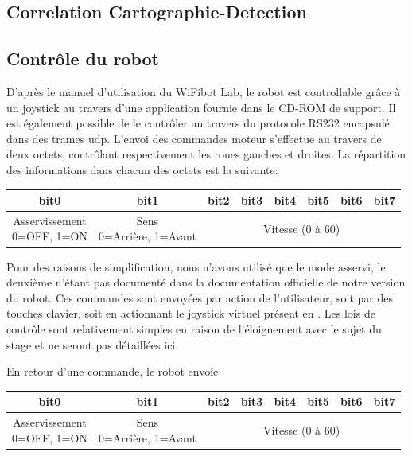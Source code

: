 		\subsection{Correlation Cartographie-Detection}
		\label{sub:corr}
		
			
		\subsection{Contrôle du robot}
		
			D'après le manuel d'utilisation du WiFibot Lab\cite{wifibot}, le robot est controllable grâce à un joystick au travers d'une application fournie dans le CD-ROM de support. Il est également possible de le contrôler au travers du protocole RS232\cite{rs232} encapsulé dans des trames \gls{udp}. L'envoi des commandes moteur s'effectue au travers de deux octets, contrôlant respectivement les roues gauches et droites. La répartition des informations dans chacun des octets est la suivante:
			\begin{center}
				\scriptsize
				\begin{tabular}[h]{|c||c||c|c|c|c|c|c|}
					\toprule
					bit0 & bit1 & bit2 & bit3 & bit4 & bit5 & bit6 & bit7 \\
					\midrule
					\specialcell{Asservissement\\ 0=OFF, 1=ON} &
					\specialcell{Sens\\ 0=Arrière, 1=Avant} &
					\multicolumn{6}{c|}{Vitesse (0 à 60)} \\
					\bottomrule
				\end{tabular}
			\end{center}
			Pour des raisons de simplification, nous n'avons utilisé que le mode asservi, le deuxième n'étant pas documenté dans la documentation officielle de notre version du robot.
			Ces commandes sont envoyées par action de l'utilisateur, soit par des touches clavier, soit en actionnant le joystick virtuel présent en \todoref.
			Les lois de contrôle sont relativement simples en raison de l'éloignement avec le sujet du stage et ne seront pas détaillées ici.
			\par
			En retour d'une commande, le robot envoie
			\begin{center}
				\scriptsize
				\begin{tabular}[h]{|c||c||c|c|c|c|c|c|}
					\toprule
					bit0 & bit1 & bit2 & bit3 & bit4 & bit5 & bit6 & bit7 \\
					\midrule
					\specialcell{Asservissement\\ 0=OFF, 1=ON} &
					\specialcell{Sens\\ 0=Arrière, 1=Avant} &
					\multicolumn{6}{c|}{Vitesse (0 à 60)} \\
					\bottomrule
				\end{tabular}
			\end{center}
			
